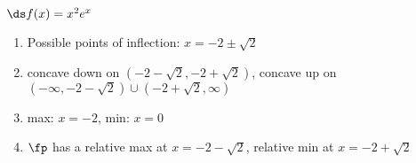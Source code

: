 {$\ds f(x) = x^2e^x$
}
{\begin{enumerate}[label=(\alph*)]
\item Possible points of inflection: $x=-2\pm\sqrt{2}$
\item concave down on $(-2-\sqrt{2},-2+\sqrt{2})$,
concave up on $(-\infty,-2-\sqrt{2}) \cup (-2+\sqrt{2},\infty)$
\item max: $x=-2$, min: $x=0$
\item $\fp$ has a relative max at $x=-2-\sqrt{2}$,
relative min at $x=-2+\sqrt{2}$
\end{enumerate}}

